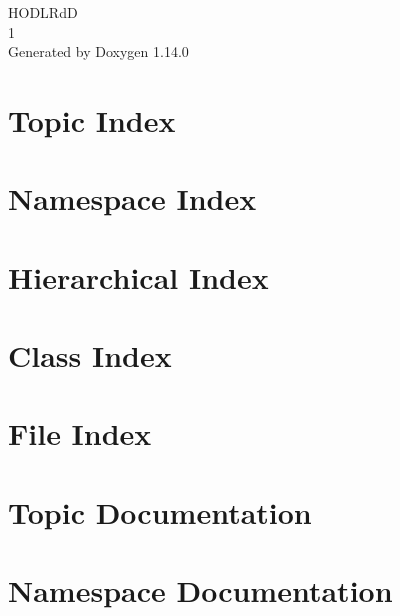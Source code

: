 \documentclass[twoside]{book}
\newcommand{\+}{\discretionary{\mbox{\scriptsize$\hookleftarrow$}}{}{}}
\newcommand{\clearemptydoublepage}{%
    \newpage{\pagestyle{empty}\cleardoublepage}%
  }
\begin{document}
  \raggedbottom
    \hypersetup{pageanchor=false,
                bookmarksnumbered=true,
                pdfencoding=unicode
               }
  \begin{titlepage}
  \vspace*{7cm}
  \begin{center}%
  {\Large HODLRdD}\\
  [1ex]\large 1 \\
  \vspace*{1cm}
  {\large Generated by Doxygen 1.14.0}\\
  \end{center}
  \end{titlepage}
  \clearemptydoublepage
  \tableofcontents
  \clearemptydoublepage
  \hypersetup{pageanchor=true}
\chapter{Topic Index}

\chapter{Namespace Index}

\chapter{Hierarchical Index}

\chapter{Class Index}

\chapter{File Index}

\chapter{Topic Documentation}


\chapter{Namespace Documentation}


\end{document}
